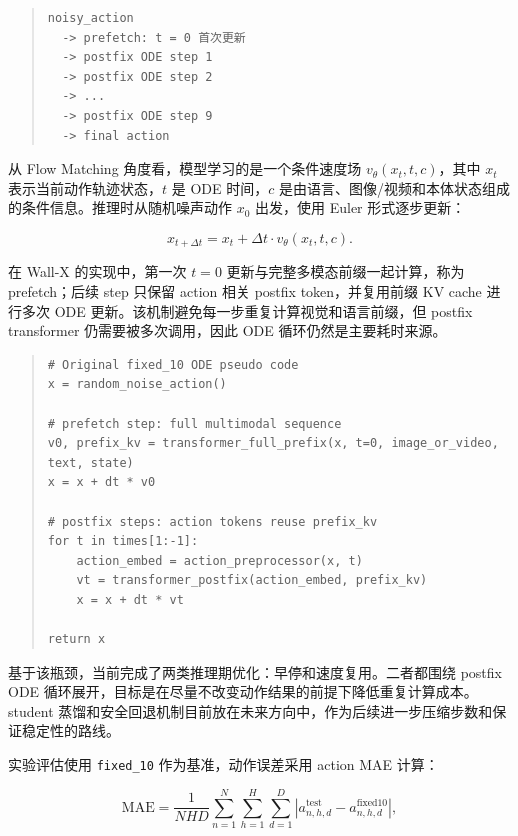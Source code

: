 \documentclass[UTF8,a4paper,12pt]{ctexart}
\begin{document}
\begin{quote}\small
\begin{verbatim}
noisy_action
  -> prefetch: t = 0 首次更新
  -> postfix ODE step 1
  -> postfix ODE step 2
  -> ...
  -> postfix ODE step 9
  -> final action
\end{verbatim}
\end{quote}

从 Flow Matching 角度看，模型学习的是一个条件速度场 \(v_\theta(x_t,t,c)\)，其中 \(x_t\) 表示当前动作轨迹状态，\(t\) 是 ODE 时间，\(c\) 是由语言、图像/视频和本体状态组成的条件信息。推理时从随机噪声动作 \(x_0\) 出发，使用 Euler 形式逐步更新：

\begin{equation}
x_{t+\Delta t}=x_t+\Delta t \cdot v_\theta(x_t,t,c).
\end{equation}

在 Wall-X 的实现中，第一次 \(t=0\) 更新与完整多模态前缀一起计算，称为 prefetch；后续 step 只保留 action 相关 postfix token，并复用前缀 KV cache 进行多次 ODE 更新。该机制避免每一步重复计算视觉和语言前缀，但 postfix transformer 仍需要被多次调用，因此 ODE 循环仍然是主要耗时来源。

\begin{quote}\small
\begin{verbatim}
# Original fixed_10 ODE pseudo code
x = random_noise_action()

# prefetch step: full multimodal sequence
v0, prefix_kv = transformer_full_prefix(x, t=0, image_or_video, text, state)
x = x + dt * v0

# postfix steps: action tokens reuse prefix_kv
for t in times[1:-1]:
    action_embed = action_preprocessor(x, t)
    vt = transformer_postfix(action_embed, prefix_kv)
    x = x + dt * vt

return x
\end{verbatim}
\end{quote}

基于该瓶颈，当前完成了两类推理期优化：早停和速度复用。二者都围绕 postfix ODE 循环展开，目标是在尽量不改变动作结果的前提下降低重复计算成本。student 蒸馏和安全回退机制目前放在未来方向中，作为后续进一步压缩步数和保证稳定性的路线。

实验评估使用 \texttt{fixed\_10} 作为基准，动作误差采用 action MAE 计算：

\begin{equation}
\mathrm{MAE}=\frac{1}{NHD}\sum_{n=1}^{N}\sum_{h=1}^{H}\sum_{d=1}^{D}
\left|a^{\mathrm{test}}_{n,h,d}-a^{\mathrm{fixed10}}_{n,h,d}\right|,
\end{equation}
\end{document}
